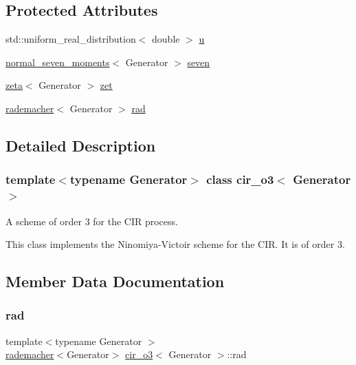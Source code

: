 \subsection*{Protected Attributes}
\begin{DoxyCompactItemize}
\item 
std\+::uniform\+\_\+real\+\_\+distribution$<$ double $>$ \mbox{\hyperlink{classcir__o3_a0e08c2c516a7f821a4a3ee8f9b0cf162}{u}}
\item 
\mbox{\hyperlink{classnormal__seven__moments}{normal\+\_\+seven\+\_\+moments}}$<$ Generator $>$ \mbox{\hyperlink{classcir__o3_a22d7ad16bc9bfb168095ab16ff0bc685}{seven}}
\item 
\mbox{\hyperlink{classzeta}{zeta}}$<$ Generator $>$ \mbox{\hyperlink{classcir__o3_aff6081fa06fbab8fd8bf06bbef2bf7c4}{zet}}
\item 
\mbox{\hyperlink{classrademacher}{rademacher}}$<$ Generator $>$ \mbox{\hyperlink{classcir__o3_a5ed2b331f33db9c48fde052e1a15a1d1}{rad}}
\end{DoxyCompactItemize}


\subsection{Detailed Description}
\subsubsection*{template$<$typename Generator$>$\newline
class cir\+\_\+o3$<$ Generator $>$}

A scheme of order 3 for the C\+IR process. 

This class implements the Ninomiya-\/\+Victoir scheme for the C\+IR. It is of order 3. 

\subsection{Member Data Documentation}
\mbox{\label{classcir__o3_a5ed2b331f33db9c48fde052e1a15a1d1}} 
\subsubsection{\texorpdfstring{rad}{rad}}
{\footnotesize\ttfamily template$<$typename Generator $>$ \\
\mbox{\hyperlink{classrademacher}{rademacher}}$<$Generator$>$ \mbox{\hyperlink{classcir__o3}{cir\+\_\+o3}}$<$ Generator $>$\+::rad\hspace{0.3cm}{\ttfamily [protected]}}

